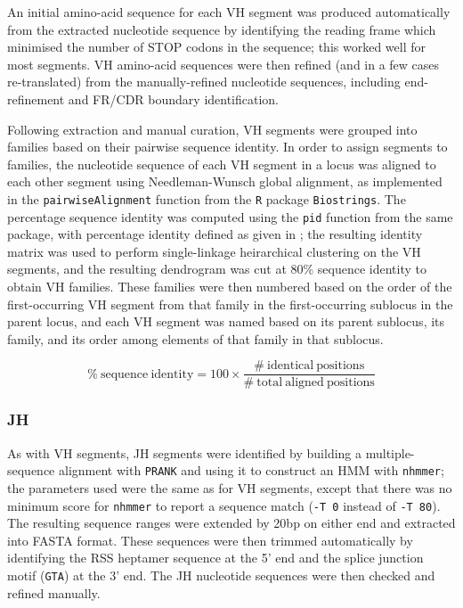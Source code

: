 An initial amino-acid sequence for each VH segment was produced automatically from the extracted nucleotide sequence by identifying the reading frame which minimised the number of STOP codons in the sequence; this worked well for most segments. VH amino-acid sequences were then refined (and in a few cases re-translated) from the manually-refined nucleotide sequences, including end-refinement and FR/CDR boundary identification.

Following extraction and manual curation, VH segments were grouped into families based on their pairwise sequence identity. In order to assign segments to families, the nucleotide sequence of each VH segment in a locus was aligned to each other segment using Needleman-Wunsch global alignment, as implemented in the \lstinline{pairwiseAlignment} function from the \lstinline{R} package \lstinline{Biostrings}. The percentage sequence identity was computed using the \lstinline{pid} function from the same package, with percentage identity defined as given in ; the resulting identity matrix was used to perform single-linkage heirarchical clustering on the VH segments, and the resulting dendrogram was cut at 80\% sequence identity to obtain VH families. These families were then numbered based on the order of the first-occurring VH segment from that family in the first-occurring sublocus in the parent locus, and each VH segment was named based on its parent sublocus, its family, and its order among elements of that family in that sublocus. %

\begin{equation}
\mathrm{\%~sequence~identity} = 100 \times \frac{\mathrm{\#~identical~positions}}{\mathrm{\#~total~aligned~positions}}
\label{eq:pid}
\end{equation}

\subsubsection{JH}

As with VH segments, JH segments were identified by building a multiple-sequence alignment with \texttt{PRANK} and using it to construct an HMM with \lstinline{nhmmer}; the parameters used were the same as for VH segments, except that there was no minimum score for \lstinline{nhmmer} to report a sequence match (\lstinline{-T 0} instead of \lstinline{-T 80}). The resulting sequence ranges were extended by 20bp on either end and extracted into FASTA format. These sequences were then trimmed automatically by identifying the RSS heptamer sequence at the 5' end and the splice junction motif (\texttt{GTA}) at the 3' end. The JH nucleotide sequences were then checked and refined manually.


